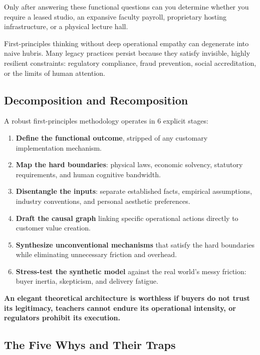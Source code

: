 Only after answering these functional questions can you determine whether you require a leased studio, an expansive faculty payroll, proprietary hosting infrastructure, or a physical lecture hall.

First-principles thinking without deep operational empathy can degenerate into naive hubris. Many legacy practices persist because they satisfy invisible, highly resilient constraints: regulatory compliance, fraud prevention, social accreditation, or the limits of human attention.

\subsection{Decomposition and Recomposition}

A robust first-principles methodology operates in 6 explicit stages:

\begin{enumerate}[leftmargin=12pt,itemsep=2pt,topsep=1pt,parsep=0pt]
  \item \textbf{Define the functional outcome}, stripped of any customary implementation mechanism.
  \item \textbf{Map the hard boundaries}: physical laws, economic solvency, statutory requirements, and human cognitive bandwidth.
  \item \textbf{Disentangle the inputs}: separate established facts, empirical assumptions, industry conventions, and personal aesthetic preferences.
  \item \textbf{Draft the causal graph} linking specific operational actions directly to customer value creation.
  \item \textbf{Synthesize unconventional mechanisms} that satisfy the hard boundaries while eliminating unnecessary friction and overhead.
  \item \textbf{Stress-test the synthetic model} against the real world's messy friction: buyer inertia, skepticism, and delivery fatigue.
\end{enumerate}

\textbf{An elegant theoretical architecture is worthless if buyers do not trust its legitimacy, teachers cannot endure its operational intensity, or regulators prohibit its execution.}

\subsection{The Five Whys and Their Traps}

